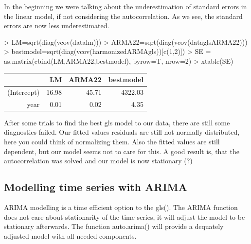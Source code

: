 \documentclass[11pt, a4paper]{article} %
\begin{document}
\linebreak

In the beginning we were talking about the underestimation of standard errors in the linear model, if not considering the autocorrelation. As we see, the standard errors are now less underestimated. 

\begin{Schunk}
\begin{Sinput}
> LM=sqrt(diag(vcov(datalm)))
> ARMA22=sqrt(diag(vcov(dataglsARMA22)))
> bestmodel=sqrt(diag(vcov(harmonizedARMAgls))[c(1,2)])
> SE = as.matrix(cbind(LM,ARMA22,bestmodel), byrow=T, nrow=2)
> xtable(SE)
\end{Sinput}
\begin{table}[ht]
\centering
\begin{tabular}{rrrr}
  \hline
 & LM & ARMA22 & bestmodel \\ 
  \hline
(Intercept) & 16.98 & 45.71 & 4322.03 \\ 
  year & 0.01 & 0.02 & 4.35 \\ 
   \hline
\end{tabular}
\end{table}\end{Schunk}
\linebreak


\noindent After some trials to find the best gls model to our data, there are still some diagnostics failed. Our fitted values residuals are still not normally distributed, here you could think of normalizing them. Also the fitted values are still dependent, but our model seems not to care for this. A good result is, that the autocorrelation was solved and our model is now stationary (?)


\subsection{Modelling time series with ARIMA }
ARIMA modelling is a time efficient option to the gls(). 
The ARIMA function does not care about stationarity of the time series, it will adjust the model  to be stationary afterwards. 
The function auto.arima() will provide a dequately adjusted model with all needed components. 
\\
\end{document}
